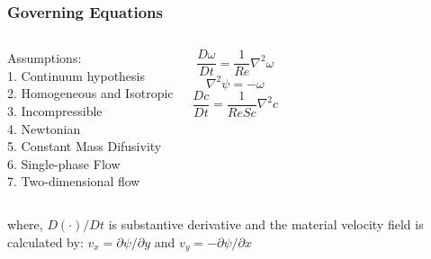 \begin{frame} 
 \frametitle{\LARGE Governing Equations}
\vspace{-1.2cm}
\begin{columns}[c]
Assumptions:\\[0.1cm]
\hspace{0.5cm}  1. Continuum hypothesis\\[0.1cm]
\hspace{0.5cm}  2. Homogeneous and Isotropic\\[0.1cm]
\hspace{0.5cm}  3. Incompressible\\[0.1cm]
\hspace{0.5cm}  4. Newtonian\\[0.1cm]
\hspace{0.5cm}  5. Constant Mass Difusivity\\[0.1cm]
\hspace{0.5cm}  6. Single-phase Flow\\[0.1cm]
\hspace{0.5cm}  7. Two-dimensional flow

\vspace{-1cm}
\begin{center}
\begin{equation*}
 \frac{D \omega}{Dt} = \frac{1}{Re} \nabla^{2} \omega
\end{equation*}
\medskip
\begin{equation*}
 \nabla^{2} \psi = - \omega
\end{equation*}
\medskip
\begin{equation*}
 \frac{Dc}{Dt} = \frac{1}{ReSc} \nabla^{2} c 
\end{equation*}
\end{center}
\end{columns}

\vspace{1.2cm}
\justifying
where, $D(\cdot)/Dt$ is substantive derivative and
the material velocity field is calculated by: 
$v_{x} = \partial \psi / \partial y$ and 
$v_{y} = - \partial \psi / \partial x$

\end{frame}



